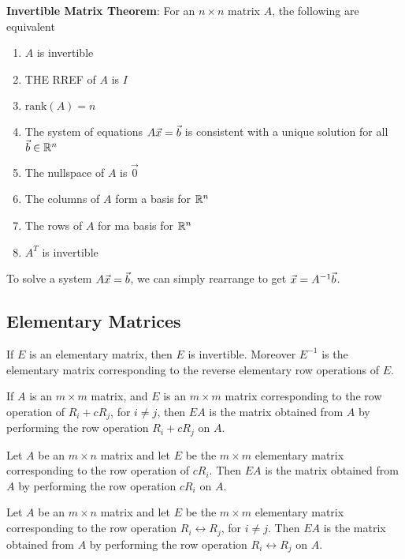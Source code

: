 \documentclass[english,12pt]{article}
\begin{document}
\begin{thrm}
\textbf{Invertible Matrix Theorem}:
For an $n \times n$ matrix $A$, the following are equivalent
\begin{enumerate}
\item $A$ is invertible
\item THE RREF of $A$ is $I$
\item $\text{rank}(A) = n$
\item The system of equations $A\vec{x} = \vec{b}$ is consistent with a unique solution for all $\vec{b} \in {\mathbb{R}}^n$
\item The nullspace of $A$ is $\vec{0}$
\item The columns of $A$ form a basis for ${\mathbb{R}}^n$
\item The rows of $A$ for ma basis for ${\mathbb{R}}^n$
\item $A^T$ is invertible
\end{enumerate}
To solve a system $A\vec{x} = \vec{b}$, we can simply rearrange to get $\vec{x} = A^{-1} \vec{b}$.
\end{thrm}

\subsection{Elementary Matrices}

\begin{thrm}
If $E$ is an elementary matrix, then $E$ is invertible. Moreover $E^{-1}$ is the elementary matrix corresponding to the reverse elementary row operations of $E$.
\end{thrm}

\begin{thrm}
If $A$ is an $m \times m$ matrix, and $E$ is an $m \times m$ matrix corresponding to the row operation of $R_i + cR_j$, for $i \neq j$, then $EA$ is the matrix obtained from $A$ by performing the row operation $R_i + cR_j$ on $A$.
\end{thrm}

\begin{thrm}
Let $A$ be an $m \times n$ matrix and let $E$ be the $m \times m$ elementary matrix corresponding to the row operation of $cR_i$. Then $EA$ is the matrix obtained from $A$ by performing the row operation $cR_i$ on $A$.
\end{thrm}

\begin{thrm}
Let $A$ be an $m \times n$ matrix and let $E$ be the $m \times m$ elementary matrix corresponding to the row operation $R_i \leftrightarrow R_j $, for $ i \neq j$. Then $EA$ is the matrix obtained from $A$ by performing the row operation $R_i \leftrightarrow R_j$ on $A$.
\end{thrm}
\end{document}

